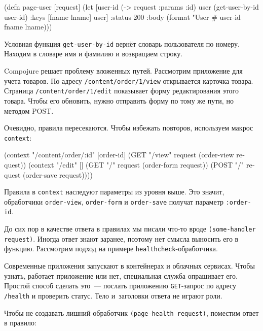 \begin{english}
  \begin{clojure}
(defn page-user [request]
  (let [user-id (-> request :params :id)
        user (get-user-by-id user-id)
        {:keys [fname lname]} user]
    {:status 200
     :body (format "User #%
                   user-id fname lname)}))
  \end{clojure}
\end{english}

Условная функция \verb|get-user-by-id| вернёт словарь пользователя по
номеру. Находим в словаре имя и фамилию и возвращаем строку.

Compojure решает проблему вложенных путей. Рассмотрим приложение для учета
товаров. По адресу \verb|/content/order/1/view| открывается карточка
товара. Страница \verb|/content/order/1/edit| показывает форму редактирования
этого товара. Чтобы его обновить, нужно отправить форму по тому же пути, но
методом POST.

Очевидно, правила пересекаются. Чтобы избежать повторов, используем макрос
\verb|context|:


\begin{english}
  \begin{clojure}
(context "/content/order/:id" [order-id]
  (GET  "/view" request (order-view request))
  (context "/edit" []
    (GET  "/" request (order-form request))
    (POST "/" request (order-save request))))
  \end{clojure}
\end{english}

Правила в \verb|context| наследуют параметры из уровня выше. Это значит,
обработчики \verb|order-view|, \verb|order-form| и \verb|order-save|
получат параметр \verb|:order-id|.

До сих пор в качестве ответа в правилах мы писали что-то вроде
\verb|(some-handler request)|. Иногда ответ знают заранее, поэтому нет смысла
выносить его в функцию. Рассмотрим подход на примере
\verb|healthcheck|-обработчика.

Современные приложения запускают в контейнерах и облачных сервисах. Чтобы
узнать, работает приложение или нет, специальная служба опрашивает его. Простой
способ сделать это~--- послать приложению \verb|GET|-запрос по адресу
\verb|/health| и проверить статус. Тело и~заголовки ответа не играют роли.

Чтобы не создавать лишний обработчик \verb|(page-health request)|, поместим
ответ в правило:

